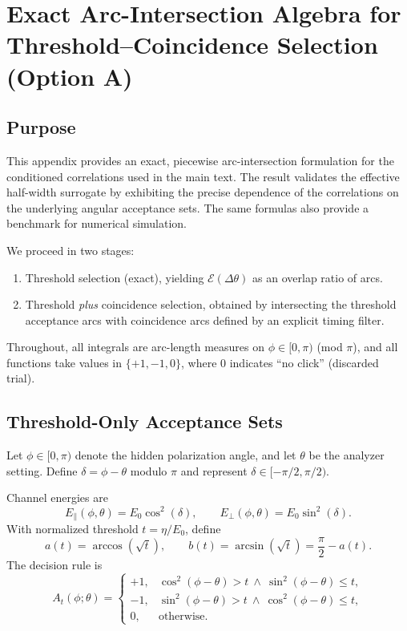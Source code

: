 \appendix
\section{Exact Arc-Intersection Algebra for Threshold--Coincidence Selection (Option A)}
\label{app:optionA}

\subsection{Purpose}

This appendix provides an exact, piecewise arc-intersection formulation for the conditioned correlations used in the main text. The result validates the effective half-width surrogate by exhibiting the precise dependence of the correlations on the underlying angular acceptance sets. The same formulas also provide a benchmark for numerical simulation.

We proceed in two stages:
\begin{enumerate}
    \item Threshold selection (exact), yielding $\mathcal{E}(\Delta\theta)$ as an overlap ratio of arcs.
    \item Threshold \emph{plus} coincidence selection, obtained by intersecting the threshold acceptance arcs with coincidence arcs defined by an explicit timing filter.
\end{enumerate}

Throughout, all integrals are arc-length measures on $\phi \in [0,\pi)$ (mod $\pi$), and all functions take values in $\{+1,-1,0\}$, where $0$ indicates ``no click'' (discarded trial).

\subsection{Threshold-Only Acceptance Sets}

Let $\phi \in [0,\pi)$ denote the hidden polarization angle, and let $\theta$ be the analyzer setting. Define $\delta=\phi-\theta$ modulo $\pi$ and represent $\delta \in [-\pi/2,\pi/2)$.

Channel energies are
\begin{equation}
E_\parallel(\phi,\theta)=E_0\cos^2(\delta),\qquad
E_\perp(\phi,\theta)=E_0\sin^2(\delta).
\end{equation}
With normalized threshold $t=\eta/E_0$, define
\begin{equation}
a(t)=\arccos(\sqrt{t}),\qquad
b(t)=\arcsin(\sqrt{t})=\frac{\pi}{2}-a(t).
\end{equation}
The decision rule is
\begin{equation}
A_t(\phi;\theta)=
\begin{cases}
+1, & \cos^2(\phi-\theta)>t \ \wedge\ \sin^2(\phi-\theta)\le t,\\
-1, & \sin^2(\phi-\theta)>t \ \wedge\ \cos^2(\phi-\theta)\le t,\\
0, & \text{otherwise}.
\end{cases}
\end{equation}

